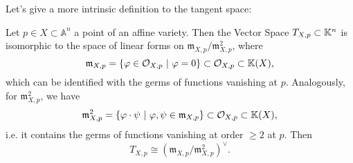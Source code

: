 Let's give a more intrinsic definition to the tangent space:
\begin{lem}
	Let $p \in X \subset \mathbb{A}^{n}$ a point of an affine variety.
	Then the Vector Space $T_{X,p} \subset \mathbb{K}^n$ is isomorphic to the space of
	linear forms on $\mathfrak{m}_{X,p}/\mathfrak{m}^2_{X,p}$, where
	\begin{equation}
	\mathfrak{m}_{X,p} = \left\{ \varphi \in \mathcal{O}_{X,p} \ \middle|\ \varphi = 0 \right\}
	\subset \mathcal{O}_{X,p} \subset \mathbb{K}(X)
	,\end{equation} 
	which can be identified with the germs of functions vanishing at $p$.
	Analogously, for $\mathfrak{m}^2_{X,p}$, we have
	\begin{equation}
	\mathfrak{m}^2_{X,p} = \left\{ \varphi \cdot \psi \ \middle|\ \varphi, \psi \in \mathfrak{m}_{X,p} \right\}
	\subset \mathcal{O}_{X,p} \subset \mathbb{K}(X)
	,\end{equation} 
	i.e. it contains the germs of functions vanishing at order $\geq 2$ at $p$.
	Then
	\begin{equation}
		T_{X,p} \cong \left( \mathfrak{m}_{X,p}/\mathfrak{m}^2_{X,p} \right)^{\vee}
	.\end{equation} 
\end{lem} 
